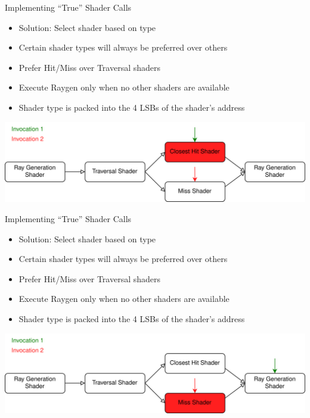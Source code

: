 \documentclass[aspectratio=169,t]{beamer}
\begin{document}
\begin{slide}{Implementing ``True'' Shader Calls}
 \begin{itemize}
  \item Solution: Select shader based on type
  \item Certain shader types will always be preferred over others
  \item Prefer Hit/Miss over Traversal shaders
  \item Execute Raygen only when no other shaders are available
  \item Shader type is packed into the 4 LSBs of the shader's address
 \end{itemize}
 \includegraphics[width=\textwidth]{graphics/RTStages2-3.png}
\end{slide}

\begin{slide}{Implementing ``True'' Shader Calls}
 \begin{itemize}
  \item Solution: Select shader based on type
  \item Certain shader types will always be preferred over others
  \item Prefer Hit/Miss over Traversal shaders
  \item Execute Raygen only when no other shaders are available
  \item Shader type is packed into the 4 LSBs of the shader's address
 \end{itemize}
 \includegraphics[width=\textwidth]{graphics/RTStages2-7.png}
\end{slide}
\end{document}
